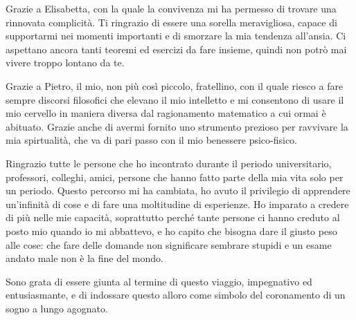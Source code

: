 Grazie a Elisabetta, con la quale la convivenza mi ha permesso di trovare una rinnovata complicità. Ti ringrazio di essere una sorella 
meravigliosa, capace di supportarmi nei momenti importanti e di smorzare la mia tendenza all'ansia. Ci aspettano ancora tanti teoremi ed 
esercizi da fare insieme, quindi non potrò mai vivere troppo lontano da te.

Grazie a Pietro, il mio, non più così piccolo, fratellino, con il quale riesco a fare sempre discorsi filosofici che elevano 
il mio intelletto e mi consentono di usare il mio cervello in maniera diversa dal ragionamento matematico a cui ormai è abituato.
Grazie anche di avermi fornito uno strumento prezioso per ravvivare la mia spirtualità, che va di pari passo con il mio benessere psico-fisico.

Ringrazio tutte le persone che ho incontrato durante il periodo universitario, professori, colleghi, amici, persone che hanno fatto parte della mia vita
solo per un periodo. Questo percorso mi ha cambiata, ho avuto il privilegio di apprendere un'infinità di cose e di fare una 
moltitudine di esperienze. Ho imparato a credere di più nelle mie capacità, soprattutto perché tante persone ci hanno creduto al 
posto mio quando io mi abbattevo, e ho capito che bisogna dare il giusto peso alle cose: che fare delle domande non significare sembrare
stupidi e un esame andato male non è la fine del mondo.

Sono grata di essere giunta al termine di questo viaggio, impegnativo ed entusiasmante, e di indossare questo alloro come simbolo del coronamento
di un sogno a lungo agognato.


